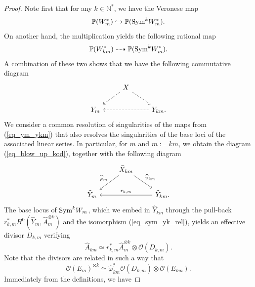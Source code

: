 \documentclass[12pt]{article}
\numberwithin{equation}{section}
\theoremstyle{theorem}
\theoremstyle{definition}
\theoremstyle{remark}
\newcommand{\nat}{\mathbb{N}}
\begin{document}
	\begin{proof}
		Note first that for any $k \in \nat^*$, we have the Veronese map
		\begin{equation}
			\mathbb{P}(W_m^*)
			\hookrightarrow
			\mathbb{P}({\rm{Sym}}^k W_m^*).
		\end{equation}
		On another hand, the multiplication yields the following rational map
		\begin{equation}
			\mathbb{P}(W_{km}^*)
			\dashrightarrow
			\mathbb{P}({\rm{Sym}}^k W_m^*).
		\end{equation}
		A combination of these two shows that we have the following commutative diagram
		\begin{equation}\label{eq_ym_ykm}
			\begin{tikzcd}
			& X \arrow[dl, dashed] \arrow[dr, dashed] & \\
	Y_m & & \arrow[ll, dashed] Y_{km}.
			\end{tikzcd}
		\end{equation}
		We consider a common resolution of singularities of the maps from (\ref{eq_ym_ykm}) that also resolves the singularities of the base loci of the associated linear series. 
		In particular, for $m$ and $m := km$, we obtain the diagram (\ref{eq_blow_up_kod}), together with the following diagram
		\begin{equation}\label{eq_commcomm00}
			\begin{tikzcd}
			& \widehat{X}_{km} \arrow[dl, "\widehat{\varphi}_m"'] \arrow[dr, "\widehat{\varphi}_{km}"] & \\
	\widehat{Y}_m & & \arrow[ll, "r_{k, m}"'] \widehat{Y}_{km}.
			\end{tikzcd}
		\end{equation}
		The base locus of ${\rm{Sym}}^k W_m$, which we embed in $\widehat{Y}_{km}$ through the pull-back $r_{k, m}^* H^0(\widehat{Y}_m, \widehat{A}_m^{\otimes k})$ and the isomorphism (\ref{eq_sym_yk_rel}), yields an effective divisor $D_{k, m}$ verifying
		\begin{equation}\label{eq_hakm_ham000}
			\widehat{A}_{km}
			\simeq
			r_{k, m}^* \widehat{A}_m^{\otimes k} \otimes \mathscr{O}(D_{k, m}).
		\end{equation}
		Note that the divisors are related in such a way that
		\begin{equation}
			\mathscr{O}(E_{m})^{\otimes k}
			\simeq
			\widehat{\varphi}_{km}^*
			\mathscr{O}(D_{k, m})
			\otimes
			\mathscr{O}(E_{km}).
		\end{equation}
		Immediately from the definitions, we have

\end{proof}
\end{document}
